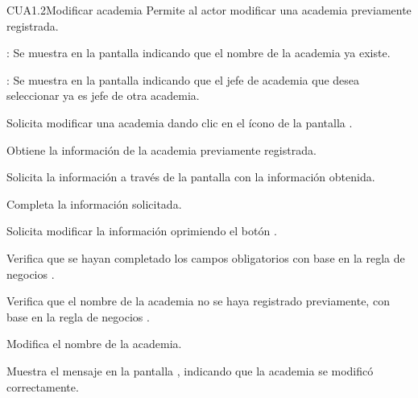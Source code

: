\begin{UseCase}{CUA1.2}{Modificar academia}{	
	Permite al actor modificar una academia previamente registrada.
}
{\begin{UClist}
			\UCli {}: Se muestra en la pantalla  indicando que el nombre de la academia ya existe.
			
			\UCli {}: Se muestra en la pantalla  indicando que el jefe de academia que desea seleccionar ya es jefe de otra academia.
			
		\end{UClist}
	}
\end{UseCase}

\begin{UCtrayectoria}
	\UCpaso [\UCactor] Solicita modificar una academia dando clic en el ícono %
	de la pantalla . 
	
	
	
	\UCpaso [\UCsist] Obtiene la información de la academia previamente registrada.

	\UCpaso[\UCsist] Solicita la información a través de la pantalla  con la información obtenida.
	
	\UCpaso [\UCactor] Completa la información solicitada. \label{CUA1.1:CompletaInfo}
	
	\UCpaso [\UCactor] Solicita modificar la información oprimiendo el botón . 
	
	\UCpaso [\UCsist] Verifica que se hayan completado los campos obligatorios con base en la regla de negocios . 
	
	\UCpaso [\UCsist] Verifica que el nombre de la academia no se haya registrado previamente, con base en la regla de negocios . 
		
	
	\UCpaso [\UCsist] Modifica el nombre de la academia.
	
	\UCpaso [\UCsist] Muestra el mensaje  en la pantalla , indicando que la academia se modificó correctamente.	
	
\end{UCtrayectoria}

